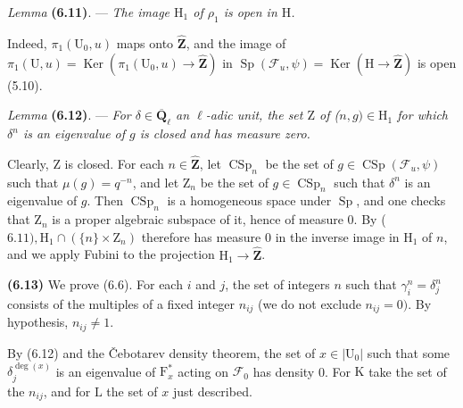 \documentclass[10pt,leqno]{article}
\begin{document}
\noindent \emph{Lemma} \textbf{(6.11)}. — {\itshape The image \(\mathrm{H}_{1}\) of \(\rho _{1}\) is open in \(\mathrm{H}\).}\par

\noindent Indeed, \(\pi _{1}(\mathrm{U}_{0},u)\) maps onto \(\widehat{\mathbf{Z}}\), and the image of \(\pi _{1}(\mathrm{U},u)=\operatorname{Ker}(\pi _{1}(\mathrm{U}_{0},u)\longrightarrow \widehat{\mathbf{Z}})\) in \(\operatorname{Sp}(\mathcal{F} _{u},\psi )=\operatorname{Ker}(\mathrm{H}\longrightarrow \widehat{\mathbf{Z}})\) is open (5.10).\par

\noindent \emph{Lemma} \textbf{(6.12)}. — {\itshape For \(\delta \in \overline{\mathbf{Q}}_{\ell }\) an \(\ell \)-adic unit, the set \(\mathrm{Z}\) of (\(n,g)\in \mathrm{H}_{1}\) for which \(\delta ^{n}\) is an eigenvalue of \(g\) is closed and has measure zero.}\par

\noindent Clearly, \(\mathrm{Z}\) is closed. For each \(n\in \widehat{\mathbf{Z}}\), let \(\operatorname{CSp}_{n}\) be the set of \(g\in \operatorname{CSp}(\mathcal{F} _{u},\psi )\) such that \(\mu (g)=q^{- n}\), and let \(\mathrm{Z}_{n}\) be the set of \(g\in \operatorname{CSp}_{n}\) such that \(\delta ^{n}\) is an eigenvalue of \(g\). Then \(\operatorname{CSp}_{n}\) is a homogeneous space under \(\operatorname{Sp}\), and one checks that \(\mathrm{Z}_{n}\) is a proper algebraic subspace of it, hence of measure 0. By (\(6.11), \mathrm{H}_{1}\cap (\{n\}\times \mathrm{Z}_{n})\) therefore has measure 0 in the inverse image in \(\mathrm{H}_{1}\) of \(n\), and we apply Fubini to the projection \(\mathrm{H}_{1}\longrightarrow \widehat{\mathbf{Z}}\).\par

\noindent \textbf{(6.13)} We prove (6.6). For each \(i\) and \(j\), the set of integers \(n\) such that \(\gamma _{i}^{n}=\delta _{j}^{n}\) consists of the multiples of a fixed integer \(n_{ij}\) (we do not exclude \(n_{ij}=0)\). By hypothesis, \(n_{ij}\ne 1\).\par

\noindent By (6.12) and the Čebotarev density theorem, the set of \(x\in |\mathrm{U}_{0}|\) such that some  \(\delta _{j}^{\operatorname{deg}(x)}\)  is an eigenvalue of \(\mathrm{F}_{x}^{*}\) acting on \(\mathcal{F} _{0}\) has density 0. For \(\mathrm{K}\) take the set of the \(n_{ij}\), and for \(\mathrm{L}\) the set of \(x\) just described.\par
\end{document}

